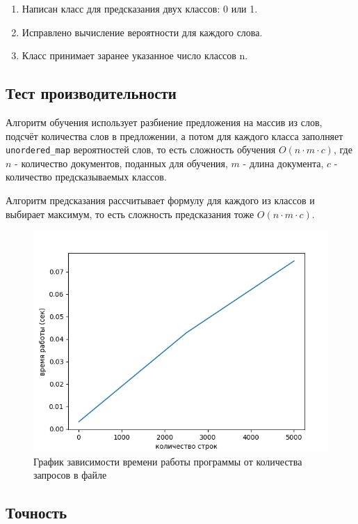 \documentclass[12pt]{article}
\begin{document}
\begin{enumerate}
    \item Написан класс для предсказания двух классов: 0 или 1.
    \item Исправлено вычисление вероятности для каждого слова.
    \item Класс принимает заранее указанное число классов n.
\end{enumerate}

\newpage
\subsection*{Тест производительности}

Алгоритм обучения использует разбиение предложения на массив из слов, подсчёт количества слов в предложении, а потом для каждого класса
заполняет \texttt{unordered\_map} вероятностей слов, то есть сложность обучения $O(n \cdot m \cdot c)$, где $n$ - количество документов,
поданных для обучения, $m$ - длина документа, $c$ - количество предсказываемых классов.

Алгоритм предсказания рассчитывает формулу для каждого из классов и выбирает максимум, то есть сложность предсказания тоже $O(n \cdot m \cdot c)$.

\begin{figure}
    \centering
    \includegraphics[width=\textwidth]{graph.png}
    \caption{График зависимости времени работы программы от количества запросов в файле}
\end{figure}


\subsection*{Точность}
\end{document}
